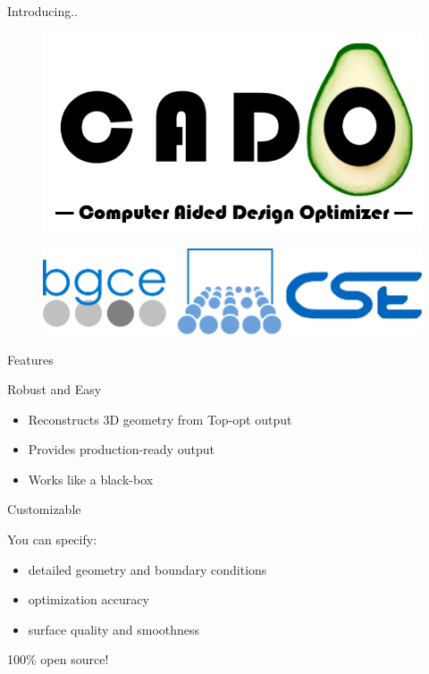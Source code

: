 \begin{frame}{Introducing..}
	\begin{figure}
		\centering
		\includegraphics[scale=0.7]{Pictures/FirstHalf/Intro_slide.pdf}
	\end{figure}
	\begin{figure}
		\centering
		\includegraphics[scale=0.35]{Pictures/FirstHalf/sccs_os2.pdf}
	\end{figure}
\end{frame}

\begin{frame}{Features}
	\begin{block}{Robust and Easy}{
			\begin{itemize}
				\item Reconstructs 3D geometry from Top-opt output
				\item Provides production-ready output
				\item Works like a black-box
			\end{itemize}
		}
	\end{block}
	\pause
	\begin{block}{Customizable}{
			You can specify:
			\begin{itemize}
				\item detailed geometry and boundary conditions
				\item optimization accuracy
				\item surface quality and smoothness
			\end{itemize}
		}
	\end{block}
	\pause
	\begin{block}{100\% open source!}{
		}
	\end{block}
\end{frame}

